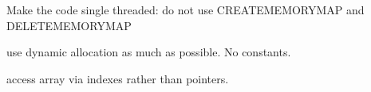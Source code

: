 \documentclass[12pt]{article}
\begin{document}
\item
Make the code single threaded: do not use CREATEMEMORYMAP and 
DELETEMEMORYMAP
\item
use dynamic allocation as much as possible. No constants.
\item
access array via indexes rather than pointers.
\end{document}
